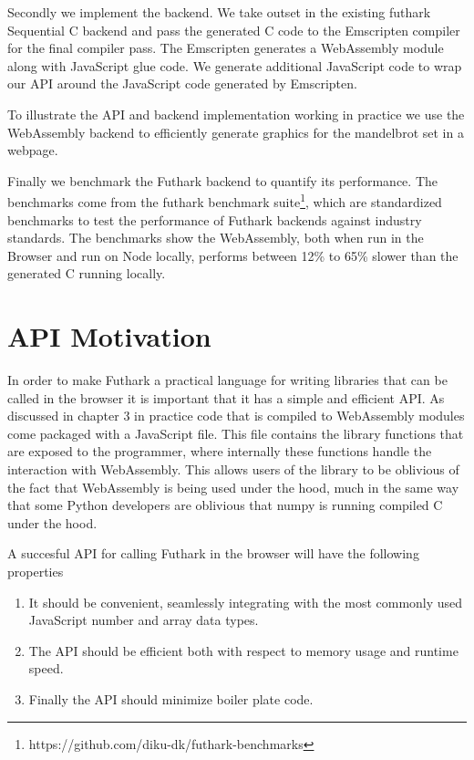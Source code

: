 \documentclass[11pt]{book}
\begin{document}
Secondly we implement the backend. We take outset in the existing futhark Sequential C backend and pass the generated C code to the Emscripten compiler for the final compiler pass. The Emscripten generates a WebAssembly module along with JavaScript glue code. We generate additional JavaScript code to wrap our API around the JavaScript code generated by Emscripten.

To illustrate the API and backend implementation working in practice we use the WebAssembly backend to efficiently generate graphics for the mandelbrot set in a webpage.

Finally we benchmark the Futhark backend to quantify its performance. The benchmarks come from the futhark benchmark suite\footnote{https://github.com/diku-dk/futhark-benchmarks}, which are standardized benchmarks to test the performance of Futhark backends against industry standards. The benchmarks show the WebAssembly, both when run in the Browser and run on Node locally, performs between 12\% to 65\% slower than the generated C running locally. 

\section{API Motivation}

In order to make Futhark a practical language for writing libraries that can be called in the browser it is important that it has a simple and efficient API. As discussed in chapter 3 in practice code that is compiled to WebAssembly modules come packaged with a JavaScript file. This file contains the library functions that are exposed to the programmer, where internally these functions handle the interaction with WebAssembly. This allows users of the library to be oblivious of the fact that WebAssembly is being used under the hood, much in the same way that some Python developers are oblivious that numpy is running compiled C under the hood.

A succesful API for calling Futhark in the browser will have the following properties
\begin{enumerate}
    \item It should be convenient, seamlessly integrating with the most commonly used JavaScript number and array data types.
    \item The API should be efficient both with respect to memory usage and runtime speed.
    \item Finally the API should minimize boiler plate code.
\end{enumerate}
\end{document}
